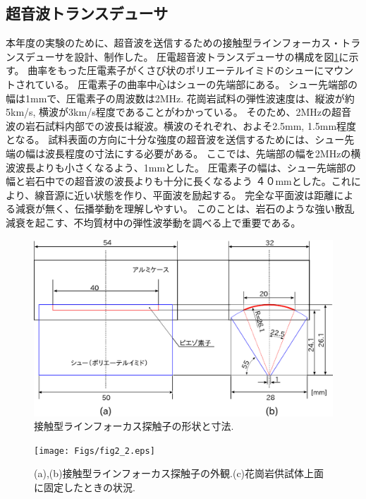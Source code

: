 \subsection{超音波トランスデューサ}
本年度の実験のために、超音波を送信するための接触型ラインフォーカス・トランスデューサを設計、制作した。
圧電超音波トランスデューサの構成を図\ref{fig:fig2}に示す。
曲率をもった圧電素子がくさび状のポリエーテルイミドのシューにマウントされている。
圧電素子の曲率中心はシューの先端部にある。
シュー先端部の幅は1mmで、圧電素子の周波数は2MHz.
花崗岩試料の弾性波速度は、縦波が約5km/s, 横波が3km/s程度であることがわかっている。
そのため、2MHzの超音波の岩石試料内部での波長は縦波。横波のそれぞれ、およそ2.5mm, 1.5mm程度となる。
試料表面の方向に十分な強度の超音波を送信するためには、シュー先端の幅は波長程度の寸法にする必要がある。
ここでは、先端部の幅を2MHzの横波波長よりも小さくなるよう、1mmとした。
圧電素子の幅は、シュー先端部の幅と岩石中での超音波の波長よりも十分に長くなるよう
４０mmとした。これにより、線音源に近い状態を作り、平面波を励起する。
完全な平面波は距離による減衰が無く、伝播挙動を理解しやすい。
このことは、岩石のような強い散乱減衰を起こす、不均質材中の弾性波挙動を調べる上で重要である。
\begin{figure}[h]
	\begin{center}
	\includegraphics[width=0.8\linewidth]{Figs/fig2.eps} 
	\end{center}
	\caption{
		接触型ラインフォーカス探触子の形状と寸法.
	} 
	\label{fig:fig2}
\end{figure}
\begin{figure}[h]
	\begin{center}
	\texttt{[image: Figs/fig2\_2.eps]} 
	\end{center}
	\caption{
		(a),(b)接触型ラインフォーカス探触子の外観.(c)花崗岩供試体上面に固定したときの状況.
	} 
	\label{fig:fig2_2}
\end{figure}
